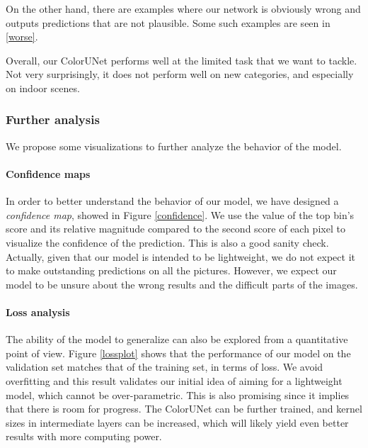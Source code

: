 \documentclass[10pt,twocolumn,letterpaper]{article}
\begin{document}
On the other hand, there are examples where our network is obviously wrong and outputs predictions that are not plausible. Some such examples are seen in \ref{worse}.

Overall, our ColorUNet performs well at the limited task that we want to tackle. Not very surprisingly, it does not perform well on new categories, and especially on indoor scenes.

\subsubsection{Further analysis}

We propose some visualizations to further analyze the behavior of the model.

\paragraph{Confidence maps}


In order to better understand the behavior of our model, we have designed a \textit{confidence map}, showed in Figure \ref{confidence}. We use the value of the top bin's score and its relative magnitude compared to the second score of each pixel to visualize the confidence of the prediction. This is also a good sanity check. Actually, given that our model is intended to be lightweight, we do not expect it to make outstanding predictions on all the pictures. However, we expect our model to be unsure about the wrong results and the difficult parts of the images.




\paragraph{Loss analysis}


The ability of the model to generalize can also be explored from a quantitative point of view. Figure \ref{lossplot} shows that the performance of our model on the validation set matches that of the training set, in terms of loss. We avoid overfitting and this result validates our initial idea of aiming for a lightweight model, which cannot be over-parametric. This is also promising since it implies that there is room for progress. The ColorUNet can be further trained, and kernel sizes in intermediate layers can be increased, which will likely yield even better results with more computing power.
\end{document}
